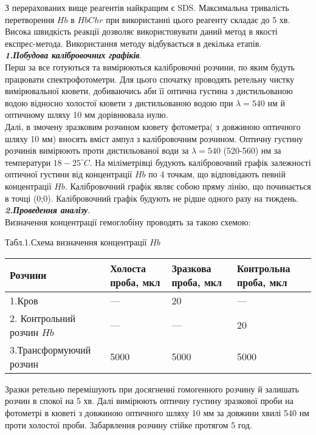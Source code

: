 \documentclass[14pt,a4paper]{scrartcl}
\begin{document}
З перерахованих вище реагентів найкращим є SDS. Максимальна тривалість перетворення $Hb$ в $HbChr$ при використанні цього реагенту складає до 5 хв. Висока швидкість реакції дозволяє використовувати даний метод в якості експрес-метода.
\newpage
Використання методу відбувається в декілька етапів. \cite{l5} \\

{\bf\itshape 1.Побудова калібровочних графіків}.\\

Перш за все готуються та вимірюються калібровочні розчини, по яким будуть працювати спектрофотометри. Для цього спочатку проводять ретельну чистку вимірювальної кювети, добиваючись аби її оптична густина з дистильованою водою відносно холостої кювети з дистильованою водою при $\lambda=540$ нм й оптичному шляху 10 мм дорівнювала нулю.\\

Далі, в змочену зразковим розчином кювету фотометра( з довжиною оптичного шляху 10 мм) вносять вміст ампул з калібровочним розчином. Оптичну густину розчинів вимірюють проти дистильованої води за $\lambda=540$ (520-560) нм за температури $18-25^{\circ}C$. На міліметрівці будують калібровочний графік залежності оптичної густини від концентрації $Hb$ по 4 точкам, що відповідають певній концентрації $Hb$. Калібровочний графік являє собою пряму лінію, що починається в точці (0;0). Калібровочний графік будують не рідше одного разу на тиждень.\\

{\bf\itshape 2.Проведення аналізу}.\\
Визначення концентрації гемоглобіну проводять за такою схемою:
\begin{center}
Табл.1.Схема визначення концентрації $Hb$
\begin{tabular}{|p{6cm}|p{2.5cm}|p{2.5cm}|p{3cm}|}
\hline
Розчини &Холоста проба, мкл& Зразкова проба, мкл &Контрольна проба, мкл\\
\hline
1.Кров&---&20&---\\
\hline
2. Контрольний розчин $Hb$&---&---&20\\
\hline
3.Трансформуючий розчин&5000&5000&5000\\
\hline
\end{tabular}
\end{center}
Зразки ретельно перемішують при досягненні гомогенного розчину й залишать розчин в спокої на 5 хв. Далі вимірюють оптичну густину зразкової проби на фотометрі в кюветі з довжиною оптичного шляху 10 мм за довжини хвилі 540 нм проти холостої проби. Забарвлення розчину стійке протягом 5 год.\\
\end{document}
